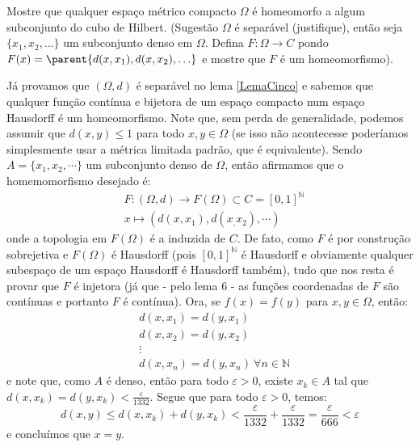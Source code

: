 \begin{Mybox}
Mostre que qualquer espaço métrico compacto $\Omega$ é homeomorfo a algum subconjunto do cubo de Hilbert. (Sugestão $\Omega$ é separável (justifique), então seja $\{ x_1, x_2, \ldots\}$ um subconjunto denso em $\Omega$. Defina $F: \Omega \to C$ pondo $F(x) = \parent{d(x, x_1), d(x, x_2), \ldots}$ e mostre que $F$ é um homeomorfismo).
\vspace{-.4cm}
\end{Mybox}
\vspace{-.5cm}
\begin{dem}
Já provamos que $(\Omega,d)$ é separável no lema \cref{LemaCinco} e sabemos que qualquer função contínua e bijetora de um espaço compacto num espaço Hausdorff é um homeomorfismo.  Note que, sem perda de generalidade, podemos assumir que $d(x, y) \leq 1$ para todo $x, y \in \Omega$ (se isso não acontecesse poderíamos simplesmente usar a métrica limitada padrão, que é equivalente). Sendo $A = \{x_1, x_2, \cdots \}$ um subconjunto denso de $\Omega$, então afirmamos que o homemomorfismo desejado é:
    \begin{align*}
        &F: (\Omega, d) \to F(\Omega) \subset C = [0,1]^{\mathbb{N}}\\
        &x \mapsto (d(x, x_1), d(x_, x_2), \cdots)
    \end{align*}
    onde a topologia em $F(\Omega)$ é a induzida de $C$. De fato, como $F$ é por construção sobrejetiva e $F(\Omega)$ é Hausdorff (pois $[0,1]^\mathbb{N}$ é Hausdorff e obviamente qualquer subespaço de um espaço Hausdorff é Hausdorff também), tudo que nos resta é provar que $F$ é injetora (já que - pelo lema $6$ - as funções coordenadas de $F$ são contínuas e portanto $F$ é contínua). Ora, se $f(x) = f(y)$ para $x, y \in \Omega$, então:
    \begin{align*}
        &d(x, x_1) = d(y, x_1) \\
        &d(x, x_2) = d(y, x_2) \\
        &\vdots\\
        &d(x, x_n) = d(y, x_n) \ \forall n \in \mathbb{N}
    \end{align*}
    e note que, como $A$ é denso, então para todo $\varepsilon > 0$, existe $x_k \in A$ tal que $d(x, x_k) = d(y, x_k) < \frac{\varepsilon}{1332}$. Segue que para todo $\varepsilon > 0$, temos: $$d(x, y) \leq d(x, x_k) + d(y, x_k) < \frac{\varepsilon}{1332} + \frac{\varepsilon}{1332} =\frac{ \varepsilon}{666} < \varepsilon$$
    e concluímos que $x = y$. 
\end{dem}





